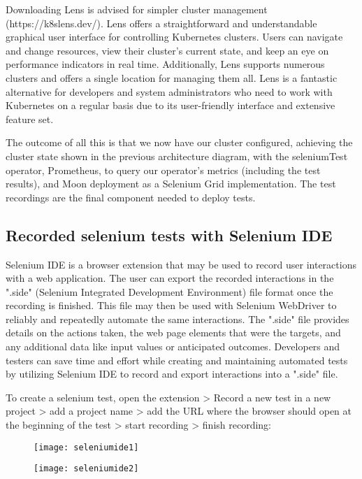 Downloading Lens is advised for simpler cluster management (https://k8slens.dev/). Lens offers a straightforward and understandable graphical user interface for controlling Kubernetes clusters. Users can navigate and change resources, view their cluster's current state, and keep an eye on performance indicators in real time. Additionally, Lens supports numerous clusters and offers a single location for managing them all. Lens is a fantastic alternative for developers and system administrators who need to work with Kubernetes on a regular basis due to its user-friendly interface and extensive feature set.

The outcome of all this is that we now have our cluster configured, achieving the cluster state shown in the previous architecture diagram, with the seleniumTest operator, Prometheus, to query our operator's metrics (including the test results), and Moon deployment as a Selenium Grid implementation. The test recordings are the final component needed to deploy tests.

\subsection{Recorded selenium tests with Selenium IDE}

Selenium IDE is a browser extension that may be used to record user interactions with a web application. The user can export the recorded interactions in the ".side" (Selenium Integrated Development Environment) file format once the recording is finished. This file may then be used with Selenium WebDriver to reliably and repeatedly automate the same interactions. The ".side" file provides details on the actions taken, the web page elements that were the targets, and any additional data like input values or anticipated outcomes. Developers and testers can save time and effort while creating and maintaining automated tests by utilizing Selenium IDE to record and export interactions into a ".side" file.

To create a selenium test, open the extension > Record a new test in a new project > add a project name > add the URL where the browser should open at the beginning of the test > start recording > finish recording:

\begin{figure}[H]
	\centering
	\texttt{[image: seleniumide1]}
	\label{fig:seleniumide1}
\end{figure}

\begin{figure}[H]
	\centering
	\texttt{[image: seleniumide2]}
	\label{fig:seleniumide2}
\end{figure}

